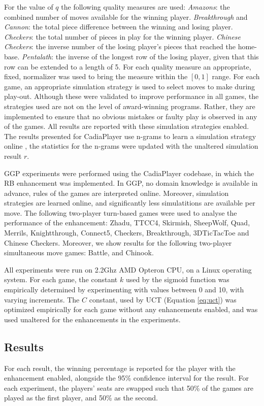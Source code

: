 \documentclass{ecai2014}
\begin{document}
For the value of $q$ the following quality measures are used: \emph{Amazons}: the combined number of moves available for the winning player. \emph{Breakthrough} and \emph{Cannon}: the total piece difference between the winning and losing player. \emph{Checkers}: the total number of pieces in play for the winning player. \emph{Chinese Checkers}: the inverse number of the losing player's pieces that reached the home-base. \emph{Pentalath}: the inverse of the longest row of the losing player, given that this row can be extended to a length of 5.
For each quality measure an appropriate, fixed, normalizer was used to bring the measure within the $[0,1]$ range. For each game, an appropriate simulation strategy is used to select moves to make during play-out. Although these were validated to improve performance in all games, the strategies used are not on the level of award-winning programs. Rather, they are implemented to ensure that no obvious mistakes or faulty play is observed in any of the games. All results are reported with these simulation strategies enabled. The results presented for {\sc CadiaPlayer} use n-grams to learn a simulation strategy online \cite{takngrams}, the statistics for the n-grams were updated with the unaltered simulation result $r$.

GGP experiments were performed using the {\sc CadiaPlayer} codebase, in which the RB enhancement was implemented. In GGP, no domain knowledge is available in advance, rules of the games are interpreted online. Moreover, simulation strategies are learned online, and significantly less simulatitions are available per move. The following two-player turn-based games were used to analyse the performance of the enhancement: Zhadu, TTCC4, Skirmish, SheepWolf, Quad, Merrils, Knightthrough, Connect5, Checkers, Breakthrough, 3DTicTacToe and Chinese Checkers. Moreover, we show results for the following two-player simultaneous move games: Battle, and Chinook.

All experiments were run on 2.2Ghz AMD Opteron CPU, on a Linux operating system. For each game, the constant $k$ used by the sigmoid function was empirically determined by experimenting with values between 0 and 10, with varying increments. The $C$ constant, used by UCT (Equation \ref{eq:uct}) was optimized empirically for each game without any enhancements enabled, and was used unaltered for the enhancements in the experiments.
\subsection{Results}
\label{subsec:results}
For each result, the winning percentage is reported for the player with the enhancement enabled, alongside the 95\% confidence interval for the result. For each experiment, the players' seats are swapped such that 50\% of the games are played as the first player, and 50\% as the second.
\end{document}
